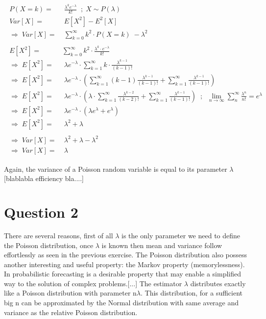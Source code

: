 \begin{align}
    \begin{split}
        P(X=k) =& \; \frac{\lambda^k e^{-\lambda}}{k!} \;\; ; \; X \sim P(\lambda) \\
        Var[X] =& \; E[X^2] - E^2[X] \\
        \Rightarrow \; Var[X] =& \; \sum_{k=0}^{\infty} k^2 \cdot P(X=k) \; - \lambda^2 \\ \\
        E[X^2] =& \sum_{k=0}^{\infty} k^2 \cdot \frac{\lambda^k \cdot e^{-\lambda}}{k!} \\
        \Rightarrow \; E[X^2] =& \; \lambda e^{-\lambda} \cdot \sum_{k=1}^{\infty} k \cdot \frac{\lambda^{k-1}}{(k-1)!} \\
        \Rightarrow \; E[X^2] =& \; \lambda e^{-\lambda} \cdot \left( \sum_{k=1}^{\infty} (k-1) \frac{\lambda^{k-1}}{(k-1)!} + \sum_{k=1}^{\infty} \frac{\lambda^{k-1}}{(k-1)!} \right) \\
        \Rightarrow \; E[X^2] =& \; \lambda e^{-\lambda} \cdot \left( \lambda \cdot \sum_{k=1}^{\infty} \frac{\lambda^{k-2}}{(k-2)!} + \sum_{k=1}^{\infty} \frac{\lambda^{k-1}}{(k-1)!} \right) \;\; ; \;\; \lim_{n \to \infty} \sum_{n}^{\infty} \frac{\lambda^n}{n!} = e^{\lambda} \\
        \Rightarrow \; E[X^2] =& \; \lambda e^{-\lambda} \cdot (\lambda e^{\lambda} + e^{\lambda}) \\
        \Rightarrow \; E[X^2] =& \; \lambda^2 + \lambda \\ \\
        \Rightarrow \; Var[X] =& \; \lambda^2 + \lambda - \lambda^2 \\
        \Rightarrow \; Var[X] =& \; \lambda
    \end{split}
\end{align}

Again, the variance of a Poisson random variable is equal to its parameter $\lambda$ [blablabla efficiency bla....]

\section{Question 2}
There are several reasons, first of all $\lambda$ is the only parameter we need to define the Poisson distribution, once $\lambda$ is known then mean and variance follow effortlessly as seen in the previous exercise.
The Poisson distribution also possess another interesting and useful property: the Markov property (memorylessness). In probabilistic forecasting is a desirable property that may enable a simplified way to the solution of complex problems.[...]
The estimator $\lambda$ distributes exactly like a Poisson distribution with parameter n$\lambda$. This distribution, for a sufficient big n can be approximated by the Normal distribution with same average and variance as the relative Poisson distribution.

